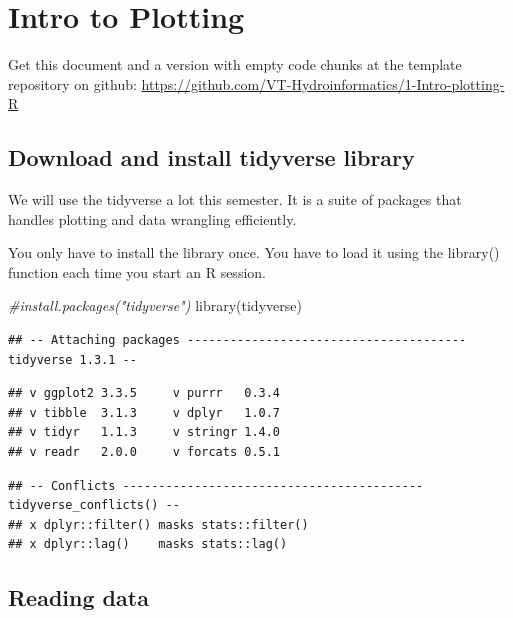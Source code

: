 \documentclass[
]{book}
\newenvironment{Shaded}{\begin{snugshade}}{\end{snugshade}}
\newcommand{\CommentTok}[1]{\textcolor[rgb]{0.56,0.35,0.01}{\textit{#1}}}
\newcommand{\FunctionTok}[1]{\textcolor[rgb]{0.00,0.00,0.00}{#1}}
\newcommand{\NormalTok}[1]{#1}
\begin{document}
\hypertarget{Plotting}{%
\chapter{Intro to Plotting}\label{Plotting}}

Get this document and a version with empty code chunks at the template repository on github: \url{https://github.com/VT-Hydroinformatics/1-Intro-plotting-R}

\hypertarget{download-and-install-tidyverse-library}{%
\section{Download and install tidyverse library}\label{download-and-install-tidyverse-library}}

We will use the tidyverse a lot this semester. It is a suite of packages that handles plotting and data wrangling efficiently.

You only have to install the library once. You have to load it using the library() function each time you start an R session.

\begin{Shaded}
\begin{Highlighting}[]
\CommentTok{\#install.packages("tidyverse")}
\FunctionTok{library}\NormalTok{(tidyverse)}
\end{Highlighting}
\end{Shaded}

\begin{verbatim}
## -- Attaching packages --------------------------------------- tidyverse 1.3.1 --
\end{verbatim}

\begin{verbatim}
## v ggplot2 3.3.5     v purrr   0.3.4
## v tibble  3.1.3     v dplyr   1.0.7
## v tidyr   1.1.3     v stringr 1.4.0
## v readr   2.0.0     v forcats 0.5.1
\end{verbatim}

\begin{verbatim}
## -- Conflicts ------------------------------------------ tidyverse_conflicts() --
## x dplyr::filter() masks stats::filter()
## x dplyr::lag()    masks stats::lag()
\end{verbatim}

\hypertarget{reading-data}{%
\section{Reading data}\label{reading-data}}
\end{document}
